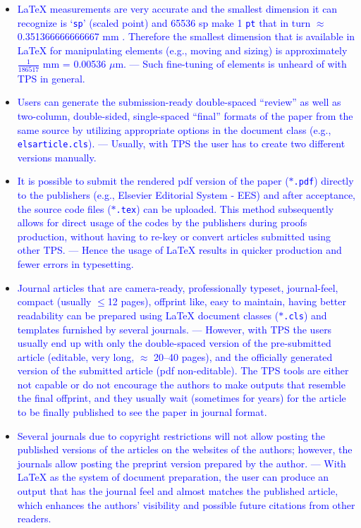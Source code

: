 \documentclass[phd]{ndsu-thesis-2022}
\newcommand\italk[1]{\textcolor{blue}{#1}}  %
\newcommand\lx{\LaTeX\xspace}
\newcommand\vb[1]{\textcolor{blue}{\texttt{#1}}}%
\begin{document}
\begin{itemize}[leftmargin=*, itemsep=0pt, parsep=3pt]
\item \italk{\lx measurements are very accurate and the smallest dimension it can recognize is `\vb{sp}' (scaled point) and 65536 sp make 1 \vb{pt} that in turn $\approx$ 0.351366666666667 mm \citep{Wikibook2016}. Therefore the smallest dimension that is available in \lx for manipulating elements (e.g., moving and sizing) is approximately $\frac{1}{186517}$ mm = 0.00536 $\mu$m. --- Such fine-tuning of elements is unheard of with TPS in general.} 

\item \italk{Users can generate the submission-ready double-spaced ``review'' as well as two-column, double-sided, single-spaced ``final'' formats of the paper from the same source by utilizing appropriate options in the document class (e.g., \vb{elsarticle.cls}). --- Usually, with TPS the user has to create two different versions manually.}   

\item \italk{It is possible to submit the rendered pdf version of the paper ($\ast$\vb{.pdf}) directly to the publishers (e.g., Elsevier Editorial System - EES) and after acceptance, the source code files ($\ast$\vb{.tex}) can be uploaded.  This method subsequently allows for direct usage of the codes by the publishers during proofs production, without having to re-key or convert articles submitted using other TPS. --- Hence the usage of \lx results in quicker production and fewer errors in typesetting.}   

\item \italk{Journal articles that are camera-ready, professionally typeset, journal-feel, compact (usually $\le$12 pages), offprint like, easy to maintain, having better readability can be prepared using \lx document classes ($\ast$\vb{.cls}) and templates furnished by several journals. --- However, with TPS the users usually end up with only the double-spaced version of the pre-submitted article (editable, very long, $\approx$ 20--40 pages), and the officially generated version of the submitted article (pdf non-editable). The TPS tools are either not capable or do not encourage the authors to make outputs that resemble the final offprint, and they usually wait (sometimes for years) for the article to be finally published to see the paper in journal format.}    

\item \italk{Several journals due to copyright restrictions will not allow posting the published versions of the articles on the websites of the authors; however, the journals allow posting the preprint version prepared by the author. --- With \lx as the system of document preparation, the user can produce an output that has the journal feel and almost matches the published article, which enhances the authors' visibility and possible future citations from other readers.}  


\end{itemize}
\end{document}
